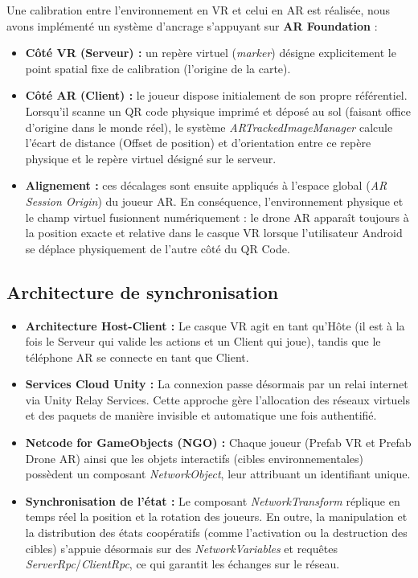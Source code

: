 \documentclass[12pt, a4paper]{article}
\begin{document}
Une calibration entre l'environnement en VR et celui en AR est réalisée, nous avons implémenté un système d'ancrage s'appuyant sur \textbf{AR Foundation} :
\begin{itemize}
  \item \textbf{Côté VR (Serveur) :} un repère virtuel (\textit{marker}) désigne explicitement le point spatial fixe de calibration (l'origine de la carte).
  \item \textbf{Côté AR (Client) :} le joueur dispose initialement de son propre référentiel. Lorsqu'il scanne un QR code physique imprimé et déposé au sol (faisant office d'origine dans le monde réel), le système \textit{ARTrackedImageManager} calcule l'écart de distance (Offset de position) et d'orientation entre ce repère physique et le repère virtuel désigné sur le serveur.
  \item \textbf{Alignement :} ces décalages sont ensuite appliqués à l'espace global (\textit{AR Session Origin}) du joueur AR. En conséquence, l'environnement physique et le champ virtuel fusionnent numériquement : le drone AR apparaît toujours à la position exacte et relative dans le casque VR lorsque l'utilisateur Android se déplace physiquement de l'autre côté du QR Code.
\end{itemize}

\subsection{Architecture de synchronisation}

\begin{itemize}
  \item \textbf{Architecture Host-Client :} Le casque VR agit en tant qu'Hôte (il est à la fois le Serveur qui valide les actions et un Client qui joue), tandis que le téléphone AR se connecte en tant que Client.

  \item \textbf{Services Cloud Unity :} La connexion passe désormais par un relai internet via Unity Relay Services. Cette approche gère l'allocation des réseaux virtuels et des paquets de manière invisible et automatique une fois authentifié.

  \item \textbf{Netcode for GameObjects (NGO) :} Chaque joueur (Prefab VR et Prefab Drone AR) ainsi que les objets interactifs (cibles environnementales) possèdent un composant \textit{NetworkObject}, leur attribuant un identifiant unique.

  \item \textbf{Synchronisation de l'état :} Le composant \textit{NetworkTransform} réplique en temps réel la position et la rotation des joueurs. En outre, la manipulation et la distribution des états coopératifs (comme l'activation ou la destruction des cibles) s'appuie désormais sur des \textit{NetworkVariables} et requêtes \textit{ServerRpc}/\textit{ClientRpc}, ce qui garantit les échanges sur le réseau.
\end{itemize}
\end{document}
